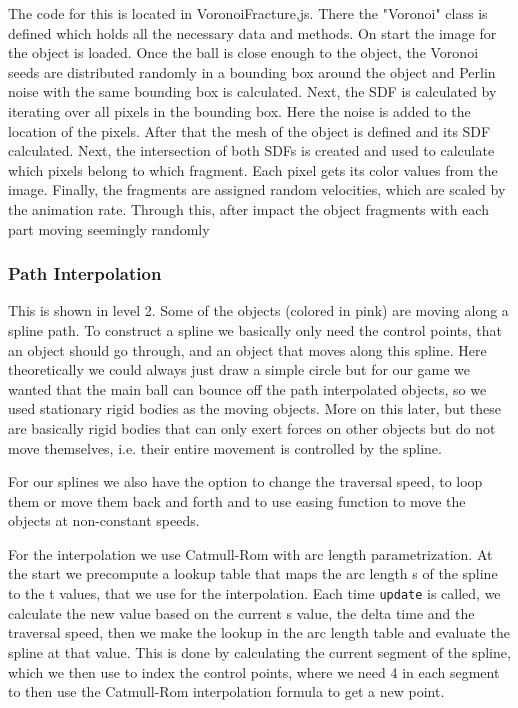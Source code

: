 \documentclass{article}
\begin{document}
The code for this is located in VoronoiFracture,js. There the "Voronoi" class is defined which holds all the necessary data and methods. On start the image for the object is loaded. Once the ball is close enough to the object, the Voronoi seeds are distributed randomly in a bounding box around the object and Perlin noise with the same bounding box is calculated. Next, the SDF is calculated by iterating over all pixels in the bounding box. Here the noise is added to the location of the pixels. After that the mesh of the object is defined and its SDF calculated. Next, the intersection of both SDFs is created and used to calculate which pixels belong to which fragment. Each pixel gets its color values from the image. Finally, the fragments are assigned random velocities, which are scaled by the animation rate. Through this, after impact the object fragments with each part moving seemingly randomly

\subsubsection{Path Interpolation}

This is shown in level 2. Some of the objects (colored in pink) are moving along a spline path. 
To construct a spline we basically only need the control points, that an object should go through, and an 
object that moves along this spline. Here theoretically we could always just draw a simple circle but 
for our game we wanted that the main ball can bounce off the path interpolated objects, so we used stationary rigid bodies
as the moving objects. More on this later, but these are basically rigid bodies that can only 
exert forces on other objects but do not move themselves, i.e. their entire movement is controlled by the spline.

For our splines we also have the option to change the traversal speed, to loop them or move them back and forth and 
to use easing function to move the objects at non-constant speeds.

For the interpolation we use Catmull-Rom with arc length parametrization. At the start 
we precompute a lookup table that maps the arc length s of the spline to the t values, that we use for the interpolation.
Each time \texttt{update} is called, we calculate the new value based on the current s value, the delta time and the traversal speed, then we make the 
lookup in the arc length table and evaluate the spline at that value. This is done by 
calculating the current segment of the spline, which we then use to index the control points, where we need 4 in each segment
to then use the Catmull-Rom interpolation formula to get a new point.
\end{document}
